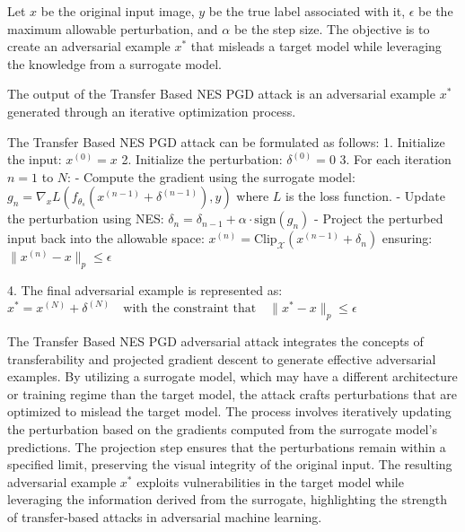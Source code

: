Let $x$ be the original input image, $y$ be the true label associated with it, $\epsilon$ be the maximum allowable perturbation, and $\alpha$ be the step size. The objective is to create an adversarial example $x^*$ that misleads a target model while leveraging the knowledge from a surrogate model.

The output of the Transfer Based NES PGD attack is an adversarial example $x^*$ generated through an iterative optimization process.

The Transfer Based NES PGD attack can be formulated as follows:
1. Initialize the input:
   $x^{(0)} = x$
2. Initialize the perturbation:
   $\delta^{(0)} = 0$
3. For each iteration $n = 1$ to $N$:
   - Compute the gradient using the surrogate model:
   $g_n = \nabla_x L(f_{\theta_s}(x^{(n-1)} + \delta^{(n-1)}), y)$
   where $L$ is the loss function.
   - Update the perturbation using NES:
   $\delta_n = \delta_{n-1} + \alpha \cdot \text{sign}(g_n)$
   - Project the perturbed input back into the allowable space:
   $x^{(n)} = \text{Clip}_{\mathcal{X}}(x^{(n-1)} + \delta_n)$
   ensuring:
   $\|x^{(n)} - x\|_p \leq \epsilon$

4. The final adversarial example is represented as:
   $x^* = x^{(N)} + \delta^{(N)} \quad \text{with the constraint that} \quad \|x^* - x\|_p \leq \epsilon$

The Transfer Based NES PGD adversarial attack integrates the concepts of transferability and projected gradient descent to generate effective adversarial examples. By utilizing a surrogate model, which may have a different architecture or training regime than the target model, the attack crafts perturbations that are optimized to mislead the target model. The process involves iteratively updating the perturbation based on the gradients computed from the surrogate model's predictions. The projection step ensures that the perturbations remain within a specified limit, preserving the visual integrity of the original input. The resulting adversarial example $x^*$ exploits vulnerabilities in the target model while leveraging the information derived from the surrogate, highlighting the strength of transfer-based attacks in adversarial machine learning.
